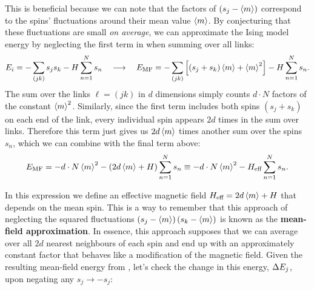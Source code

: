 This is beneficial because we can note that the factors of $\left(s_j - \left\langle m \right\rangle\right)$ correspond to the spins' fluctuations around their mean value $\left\langle m \right\rangle$.
By conjecturing that these fluctuations are small \textit{on average}, we can approximate the Ising model energy by neglecting the first term in  when summing over all links:
\begin{equation*}
  E_i = -\sum_{(jk)} s_j s_k - H \sum_{n = 1}^N s_n \quad \longrightarrow \quad E_{\text{MF}} = -\sum_{(jk)} \left[\left(s_j + s_k\right)\left\langle m \right\rangle + \left\langle m \right\rangle^2\right] - H \sum_{n = 1}^N s_n.
\end{equation*}
The sum over the links $\ell = (jk)$ in $d$ dimensions simply counts $d\cdot N$ factors of the constant $\left\langle m \right\rangle^2$.
Similarly, since the first term includes both spins $\left(s_j + s_k\right)$ on each end of the link, every individual spin appears $2d$ times in the sum over links.
Therefore this term just gives us $2d\left\langle m \right\rangle$ times another sum over the spins $s_n$, which we can combine with the final term above:
\begin{equation}
  \label{eq:MF_energy}
  E_{\text{MF}} = -d\cdot N \left\langle m \right\rangle^2 - \left(2d\left\langle m \right\rangle + H\right) \sum_{n = 1}^N s_n \equiv -d\cdot N \left\langle m \right\rangle^2 - H_{\text{eff}} \sum_{n = 1}^N s_n.
\end{equation}

In this expression we define an effective magnetic field $H_{\text{eff}} = 2d\left\langle m \right\rangle + H$ that depends on the mean spin.
This is a way to remember that this approach of neglecting the squared fluctuations $\left(s_j - \left\langle m \right\rangle\right) \left(s_k - \left\langle m \right\rangle\right)$ is known as the \textbf{mean-field approximation}.
In essence, this approach supposes that we can average over all $2d$ nearest neighbours of each spin and end up with an approximately constant factor that behaves like a modification of the magnetic field. %
Given the resulting mean-field energy \EMF from , let's check the change in this energy, $\Delta E_j$, upon negating any $s_j \to -s_j$:
\begin{mdframed}
  \ \\[120 pt]
\end{mdframed}

